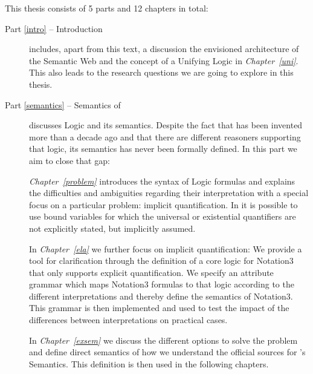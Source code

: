This thesis consists of 5 parts and 12 chapters in total:

\begin{description}
\item[Part \ref{intro} -- Introduction] includes, apart from this text, a discussion the envisioned architecture of the Semantic Web and the concept of a 
Unifying Logic in \emph{Chapter~\ref{uni}}. This also leads to the research questions we are going to explore in this thesis.
\item[Part \ref{semantics} -- Semantics of \nthree] discusses \notationthree Logic and its semantics. Despite the fact that \notationthree has 
been invented more than a decade ago and that there are different reasoners supporting that logic, its semantics has never been formally defined. 
In this part we aim to close that gap:

\emph{Chapter~\ref{problem}} introduces the syntax of \notationthree Logic formulas 
and explains the difficulties and ambiguities regarding their interpretation with a special focus on a particular problem: implicit quantification.
In \notationthree it is possible to
use bound variables for which the universal or existential quantifiers are not explicitly stated,
but implicitly assumed. %



In \emph{Chapter~\ref{ela}} we further focus on implicit quantification: We provide a tool for clarification through the definition of a core logic for 
Notation3 that only supports explicit quantification. 
We specify an attribute grammar which maps Notation3 formulas to that logic according to the different interpretations and thereby define the
semantics of Notation3.
This grammar is then implemented and used to test the impact of the differences between interpretations on practical cases. 


In \emph{Chapter~\ref{exsem}}
% 
we discuss the different options to solve the problem and define direct semantics of how we understand the official sources for \nthree's Semantics. This definition
is then used in the following chapters.


\end{description}
